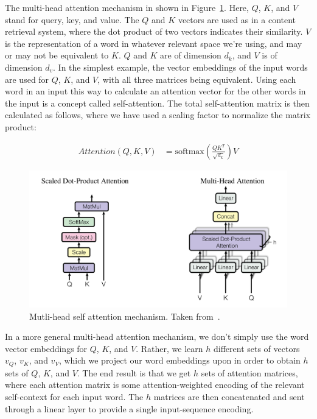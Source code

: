 The multi-head attention mechanism in shown in Figure~\ref{fig:transformer_dot_product_attention}. Here, $Q$, $K$, and $V$ stand for query, key, and value. The $Q$ and $K$ vectors are used as in a content retrieval system, where the dot product of two vectors indicates their similarity. $V$ is the representation of a word in whatever relevant space we're using, and may or may not be equivalent to $K$. $Q$ and $K$ are of dimension $d_k$, and $V$ is of dimension $d_v$. In the simplest example, the vector embeddings of the input words are used for $Q$, $K$, and $V$, with all three matrices being equivalent. Using each word in an input this way to calculate an attention vector for the other words in the input is a concept called self-attention. The total self-attention matrix is then calculated as follows, where we have used a scaling factor to normalize the matrix product:

\begin{align}
    Attention(Q,K,V)&=\text{softmax}(\frac{QK^T}{\sqrt{d_k}})V
\end{align}

\begin{figure}[htbp]
    \centering
    \includegraphics[width=\linewidth]{Images/ML/transformer_dot_product_attention.png}
    \caption{Mutli-head self attention mechanism. Taken from~\cite{transformer}.}
    \label{fig:transformer_dot_product_attention}
\end{figure}

In a more general multi-head attention mechanism, we don't simply use the word vector embeddings for $Q$, $K$, and $V$. Rather, we learn $h$ different sets of vectors $v_Q$, $v_K$, and $v_V$, which we project our word embeddings upon in order to obtain $h$ sets of $Q$, $K$, and $V$. The end result is that we get $h$ sets of attention matrices, where each attention matrix is some attention-weighted encoding of the relevant self-context for each input word. The $h$ matrices are then concatenated and sent through a linear layer to provide a single input-sequence encoding.

